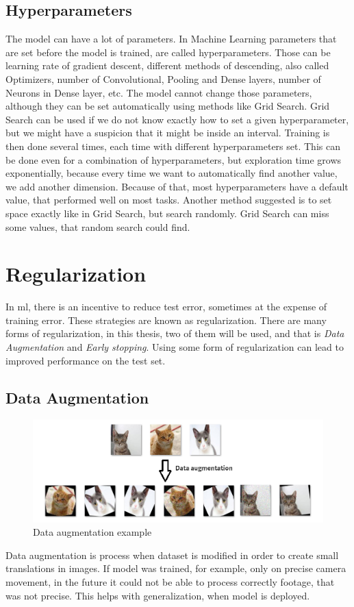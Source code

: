 \documentclass[thesis=B,english]{FITthesis}[2019/12/23]
\begin{document}
\subsection{Hyperparameters} \label{sec:hyperparameters}
    The model can have a lot of parameters. In Machine Learning parameters that are set before the model is trained, are called hyperparameters. Those can be learning rate of gradient descent, different methods of descending, also called Optimizers, number of Convolutional, Pooling and Dense layers, number of Neurons in Dense layer, etc. The model cannot change those parameters, although they can be set automatically using methods like Grid Search. Grid Search can be used if we do not know exactly how to set a given hyperparameter, but we might have a suspicion that it might be inside an interval. Training is then done several times, each time with different hyperparameters set. This can be done even for a combination of hyperparameters, but exploration time grows exponentially, because every time we want to automatically find another value, we add another dimension. Because of that, most hyperparameters have a default value, that performed well on most tasks. Another method suggested \cite{bengio2017deep} is to set space exactly like in Grid Search, but search randomly. Grid Search can miss some values, that random search could find. 

\section{Regularization}
    In \gls{ml}, there is an incentive to reduce test error, sometimes at the expense of training error. These strategies are known as regularization. There are many forms of regularization, in this thesis, two of them will be used, and that is \emph{Data Augmentation} and \emph{Early stopping}. Using some form of regularization can lead to improved performance on the test set.

\subsection{Data Augmentation}
\begin{figure}
    \centering
    \includegraphics[width=\textwidth]{image_augmentation.png}
    \caption[Data augmentation example]{Data augmentation example \cite{himblot_2018}}
    \label{fig:augmentation}
\end{figure}
    Data augmentation is process when dataset is modified in order to create small translations in images. If model was trained, for example, only on precise camera movement, in the future it could not be able to process correctly footage, that was not precise. This helps with generalization, when model is deployed.
\end{document}
